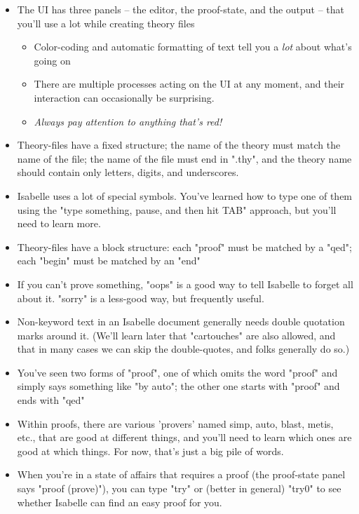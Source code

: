 \begin{itemize}
    \item The UI has three panels -- the editor, the proof-state, and the output -- that you'll use a lot while creating theory files

\begin{itemize}
        \item Color-coding and automatic formatting of text tell you a \textit{lot} about what's going on
        \item There are multiple processes acting on the UI at any moment, and their interaction can occasionally be surprising. 
        \item \textit{\textit{Always} pay attention to anything that's red!}
\end{itemize}

    \item Theory-files have a fixed structure; the name of the theory must match the name of the file; the name of the file must end in ".thy", and the theory name should contain only letters, digits, and underscores. 
    \item Isabelle uses a lot of special symbols. You've learned how to type one of them using the "type something, pause, and then hit TAB" approach, but you'll need to learn more. 
    \item Theory-files have a block structure: each "proof" must be matched by a "qed"; each "begin" must be matched by an "end"
    \item If you can't prove something, "oops" is a good way to tell Isabelle to forget all about it. "sorry" is a less-good way, but frequently useful.
    \item Non-keyword text in an Isabelle document generally needs double quotation marks around it. (We'll learn later that "cartouches" are also allowed, and that in many cases we can skip the double-quotes, and folks generally do so.)
    \item You've seen two forms of "proof", one of which omits the word "proof" and simply says something like "by auto"; the other one starts with "proof" and ends with "qed"
    \item Within proofs, there are various 'provers' named simp, auto, blast, metis, etc., that are good at different things, and you'll need to learn which ones are good at which things. For now, that's just a big pile of words. 
    \item When you're in a state of affairs that requires a proof (the proof-state panel says "proof (prove)"), you can type "try" or (better in general) "try0" to see whether Isabelle can find an easy proof for you. 

\end{itemize}
